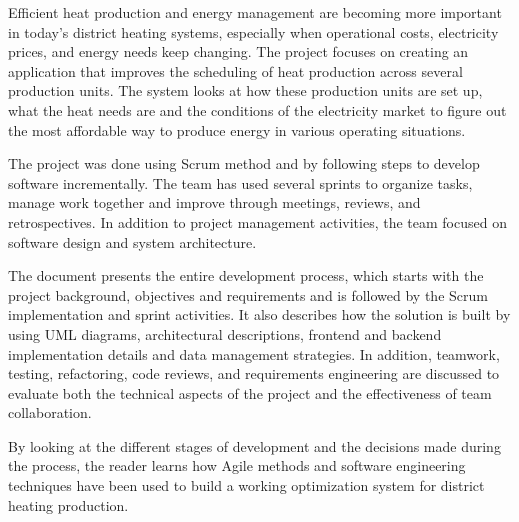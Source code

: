 

\noindent
Efficient heat production and energy management are becoming more important in today’s district heating systems, especially when operational costs, electricity prices, and energy needs keep changing. The project focuses on creating an application that improves the scheduling of heat production across several production units. The system looks at how these production units are set up, what the heat needs are and the conditions of the electricity market to figure out the most affordable way to produce energy in various operating situations.
\par
The project was done using Scrum method and by following steps to develop software incrementally. The team has used several sprints to organize tasks, manage work together and improve through meetings, reviews, and retrospectives. In addition to project management activities, the team focused on software design and system architecture. 
\par  
The document presents the entire development process, which starts with the project background, objectives and requirements and is followed by the Scrum implementation and sprint activities. It also describes how the solution is built by using UML diagrams, architectural descriptions, frontend and backend implementation details and data management strategies. In addition, teamwork, testing, refactoring, code reviews, and requirements engineering are discussed to evaluate both the technical aspects of the project and the effectiveness of team collaboration. 
\par
By looking at the different stages of development and the decisions made during the process, the reader learns how Agile methods and software engineering techniques have been used to build a working optimization system for district heating production.
